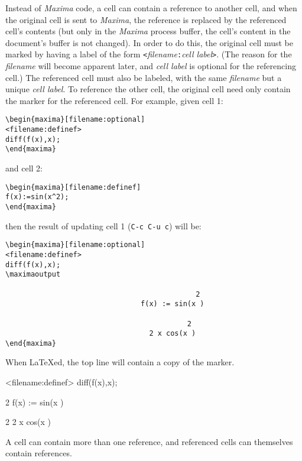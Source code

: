 \documentclass{article}
\newcommand{\mx}{\textsl{\sffamily Maxima}}
\begin{document}
\noindent
Instead of \mx{} code, a cell can contain a reference to another cell,
and when the original cell is sent to \mx{}, the reference is replaced
by the referenced cell's contents (but only in the \mx{} process
buffer, the cell's 
content in the document's buffer is not changed).  In order to do
this, the original cell must be marked by having a label of the form
\texttt{<}\textsl{filename}\texttt{:}\textsl{cell label}\texttt{>}.
(The reason for the \textsl{filename} will become apparent later, and
\textsl{cell label} is optional for the referencing cell.)
The referenced cell must also be labeled, with the same
\textsl{filename} but a unique \textsl{cell label}.  To reference the
other cell, the original cell need only contain the marker for the
referenced cell.  For example, given cell 1:
\begin{verbatim}
\begin{maxima}[filename:optional]
<filename:definef>
diff(f(x),x);
\end{maxima}
\end{verbatim}
\noindent
and cell 2:
\begin{verbatim}
\begin{maxima}[filename:definef]
f(x):=sin(x^2);
\end{maxima}
\end{verbatim}
\noindent
then the result of updating cell 1 (\texttt{C-c C-u c}) will be:
\begin{verbatim}
\begin{maxima}[filename:optional]
<filename:definef>
diff(f(x),x);
\maximaoutput

                                             2
                                f(x) := sin(x )

                                           2
                                  2 x cos(x )
\end{maxima}
\end{verbatim}
\noindent
When \LaTeX{}ed, the top line will contain a copy of the marker.

\begin{maxima}
<filename:definef>
diff(f(x),x);
\maximaoutput

                                             2
                                f(x) := sin(x )

                                           2
                                  2 x cos(x )
\end{maxima}

A cell can contain more than one reference, and referenced cells can
themselves contain references.  
\end{document}
